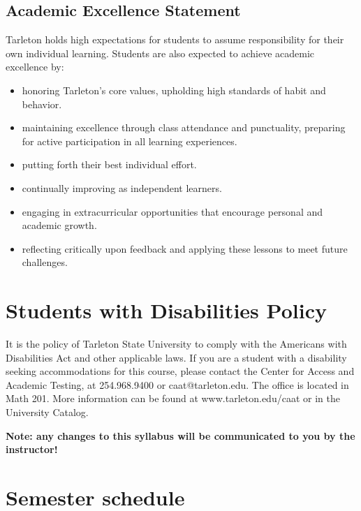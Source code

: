 \documentclass[10pt]{article}
\begin{document}
\subsection*{Academic Excellence Statement}
\label{sec:org3b452ea}
Tarleton holds high expectations for students to assume responsibility for their own individual learning. Students are also expected to achieve academic excellence by:
\begin{itemize}
\item honoring Tarleton’s core values, upholding high standards of habit and behavior.
\item maintaining excellence through class attendance and punctuality, preparing for active participation in all learning experiences.
\item putting forth their best individual effort.
\item continually improving as independent learners.
\item engaging in extracurricular opportunities that encourage personal and academic growth.
\item reflecting critically upon feedback and applying these lessons to meet future challenges.
\end{itemize}

\section*{Students with Disabilities Policy}
\label{sec:orgfddfa4e}

It is the policy of Tarleton State University to comply with the Americans with Disabilities Act and other applicable laws. If you are a student with a disability seeking accommodations for this course, please contact the Center for Access and Academic Testing, at 254.968.9400 or caat@tarleton.edu. The office is located in Math 201. More information can be found at www.tarleton.edu/caat or in the University Catalog.

\textbf{\textbf{Note:  any changes to this syllabus will be communicated to you by the instructor!}}

\section*{Semester schedule}
\label{sec:org6df076b}
\end{document}

